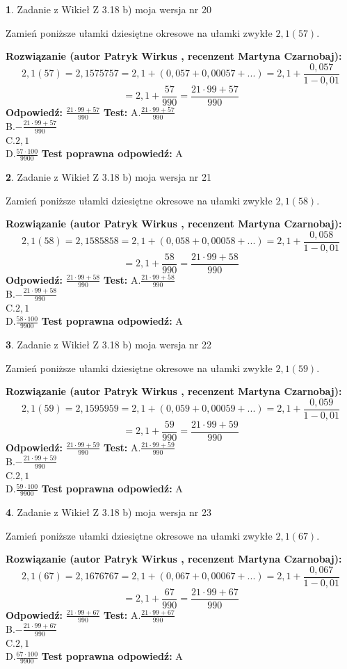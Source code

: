 \documentclass[12pt, a4paper]{article}
\theoremstyle{definition} %
\newtheorem{zad}{}
\newcommand{\zadStart}[1]{\begin{zad}#1\newline}
\newcommand{\zadStop}{\end{zad}}
\newcommand{\rozwStart}[2]{\noindent \textbf{Rozwiązanie (autor #1 , recenzent #2): }\newline}
\newcommand{\rozwStop}{\newline}
\newcommand{\odpStart}{\noindent \textbf{Odpowiedź:}\newline}
\newcommand{\odpStop}{\newline}
\newcommand{\testStart}{\noindent \textbf{Test:}\newline}
\newcommand{\testStop}{\newline}
\newcommand{\kluczStart}{\noindent \textbf{Test poprawna odpowiedź:}\newline}
\newcommand{\kluczStop}{\newline}
\begin{document}
\zadStart{Zadanie z Wikieł Z 3.18 b) moja wersja nr 20}

Zamień poniższe ułamki dziesiętne okresowe na ułamki zwykłe $2,1(57)$.
\zadStop
\rozwStart{Patryk Wirkus}{Martyna Czarnobaj}
$$2,1(57)=2,1575757=2,1+(0,057+0,00057+...)=2,1+\frac{0,057}{1-0,01}$$
$$=2,1+\frac{57}{990}=\frac{21\cdot99+57}{990}$$
\rozwStop
\odpStart
$\frac{21\cdot99+57}{990}$
\odpStop
\testStart
A.$\frac{21\cdot99+57}{990}$\\ B.$-\frac{21\cdot99+57}{990}$\\ C.$2,1$\\ D.$\frac{57\cdot100}{9900}$
\testStop
\kluczStart
A
\kluczStop



\zadStart{Zadanie z Wikieł Z 3.18 b) moja wersja nr 21}

Zamień poniższe ułamki dziesiętne okresowe na ułamki zwykłe $2,1(58)$.
\zadStop
\rozwStart{Patryk Wirkus}{Martyna Czarnobaj}
$$2,1(58)=2,1585858=2,1+(0,058+0,00058+...)=2,1+\frac{0,058}{1-0,01}$$
$$=2,1+\frac{58}{990}=\frac{21\cdot99+58}{990}$$
\rozwStop
\odpStart
$\frac{21\cdot99+58}{990}$
\odpStop
\testStart
A.$\frac{21\cdot99+58}{990}$\\ B.$-\frac{21\cdot99+58}{990}$\\ C.$2,1$\\ D.$\frac{58\cdot100}{9900}$
\testStop
\kluczStart
A
\kluczStop



\zadStart{Zadanie z Wikieł Z 3.18 b) moja wersja nr 22}

Zamień poniższe ułamki dziesiętne okresowe na ułamki zwykłe $2,1(59)$.
\zadStop
\rozwStart{Patryk Wirkus}{Martyna Czarnobaj}
$$2,1(59)=2,1595959=2,1+(0,059+0,00059+...)=2,1+\frac{0,059}{1-0,01}$$
$$=2,1+\frac{59}{990}=\frac{21\cdot99+59}{990}$$
\rozwStop
\odpStart
$\frac{21\cdot99+59}{990}$
\odpStop
\testStart
A.$\frac{21\cdot99+59}{990}$\\ B.$-\frac{21\cdot99+59}{990}$\\ C.$2,1$\\ D.$\frac{59\cdot100}{9900}$
\testStop
\kluczStart
A
\kluczStop



\zadStart{Zadanie z Wikieł Z 3.18 b) moja wersja nr 23}

Zamień poniższe ułamki dziesiętne okresowe na ułamki zwykłe $2,1(67)$.
\zadStop
\rozwStart{Patryk Wirkus}{Martyna Czarnobaj}
$$2,1(67)=2,1676767=2,1+(0,067+0,00067+...)=2,1+\frac{0,067}{1-0,01}$$
$$=2,1+\frac{67}{990}=\frac{21\cdot99+67}{990}$$
\rozwStop
\odpStart
$\frac{21\cdot99+67}{990}$
\odpStop
\testStart
A.$\frac{21\cdot99+67}{990}$\\ B.$-\frac{21\cdot99+67}{990}$\\ C.$2,1$\\ D.$\frac{67\cdot100}{9900}$
\testStop
\kluczStart
A
\kluczStop
\end{document}
